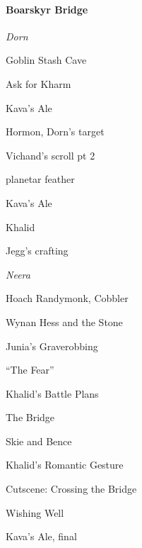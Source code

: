 \documentclass[10pt,a4,twoside]{book}
\begin{document}
\begin{multicols}{3}
\paragraph*{Boarskyr Bridge}
\begin{trivlist}
\item \emph{Dorn}
\item Goblin Stash Cave
\item Ask for Kharm %
\item Kava's Ale %
\item Hormon, Dorn's target
\item Vichand's scroll pt 2
\item planetar feather %
\item Kava's Ale %

\item Khalid
\item Jegg's crafting %
\item \emph{Neera}
\item Hoach Randymonk, Cobbler
\item Wynan Hess and the Stone
\item Junia's Graverobbing
\item ``The Fear''


\item Khalid's Battle Plans
\item The Bridge
\item Skie and Bence
\item Khalid's Romantic Gesture %
\item Cutscene: Crossing the Bridge
\item Wishing Well
\item Kava's Ale, final
\end{trivlist}


\end{multicols}
\end{document}
